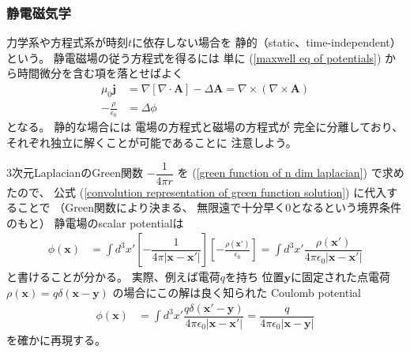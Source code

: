\subsubsection{静電磁気学}

力学系や方程式系が時刻$t$に依存しない場合を
静的（static、time-independent）という。
静電磁場の従う方程式を得るには
単に
(\ref{maxwell eq of potentials})
から時間微分を含む項を落とせばよく
\begin{subequations}
\begin{align}
  \mu_0 \bm{j}
&=
  \nabla
  \left[
    \nabla \cdot
      \bm{A}
  \right]
  -
    \Delta
    \bm{A}
=
  \nabla \times
    (\nabla \times \bm{A})
\label{static eq for ele-mag vector potential}
\\
  - \frac{\rho}{\epsilon_0}
&=
  \Delta \phi
\end{align}
\end{subequations}
となる。
静的な場合には
電場の方程式と磁場の方程式が
完全に分離しており、
それぞれ独立に解くことが可能であることに
注意しよう。

$3$次元LaplacianのGreen関数
$ - \dfrac{1}{4 \pi r} $
を
(\ref{green function of n dim laplacian})
で求めたので、
公式
(\ref{convolution representation of green function solution})
に代入することで
（Green関数により決まる、
無限遠で十分早く$0$となるという境界条件のもと）
静電場のscalar potentialは
\begin{align}
  \phi (\bm{x})
&=
  \int d^3 x'
  \left[
    - \dfrac{1}{
      4 \pi |\bm{x} - \bm{x}'|
    }
  \right]
  \left[
    - \frac{\rho(\bm{x}')}{\epsilon_0}
  \right]
=
  \int d^3 x'
    \dfrac{\rho(\bm{x}')}{
      4 \pi \epsilon_0
      |\bm{x} - \bm{x}'|
    }
\end{align}
と書けることが分かる。
実際、例えば電荷$q$を持ち
位置$\bm{y}$に固定された点電荷
$\rho(\bm{x})
= q \delta(\bm{x} - \bm{y})$
の場合にこの解は良く知られた
Coulomb potential
\begin{align}
  \phi (\bm{x})
&=
  \int d^3 x'
    \dfrac{
      q \delta(\bm{x}' - \bm{y})
    }{
      4 \pi \epsilon_0
      |\bm{x} - \bm{x}'|
    }
=
    \dfrac{ q }{
      4 \pi \epsilon_0
      |\bm{x} - \bm{y}|
    }
\end{align}
を確かに再現する。

